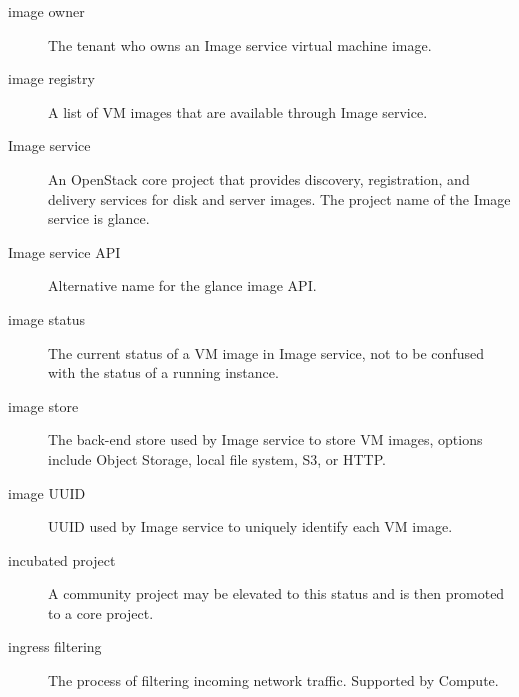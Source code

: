 \documentclass[letterpaper,10pt,english]{sphinxmanual}
\begin{document}
\begin{description}
\item[{image owner}] \leavevmode{}\label{_source/glossary:term-image-owner}
The tenant who owns an Image service virtual machine
image.

\item[{image registry}] \leavevmode{}\label{_source/glossary:term-image-registry}
A list of VM images that are available through Image
service.

\item[{Image service}] \leavevmode{}\label{_source/glossary:term-image-service}
An OpenStack core project that provides discovery, registration,
and delivery services for disk and server images. The project name of
the Image service is glance.

\item[{Image service API}] \leavevmode{}\label{_source/glossary:term-image-service-api}
Alternative name for the glance image API.

\item[{image status}] \leavevmode{}\label{_source/glossary:term-image-status}
The current status of a VM image in Image service, not to be
confused with the status of a running instance.

\item[{image store}] \leavevmode{}\label{_source/glossary:term-image-store}
The back-end store used by Image service to store VM images,
options include Object Storage, local file system, S3, or HTTP.

\item[{image UUID}] \leavevmode{}\label{_source/glossary:term-image-uuid}
UUID used by Image service to uniquely identify each VM
image.

\item[{incubated project}] \leavevmode{}\label{_source/glossary:term-incubated-project}
A community project may be elevated to this status and is then
promoted to a core project.

\item[{ingress filtering}] \leavevmode{}\label{_source/glossary:term-ingress-filtering}
The process of filtering incoming network traffic. Supported by
Compute.


\end{description}
\end{document}
